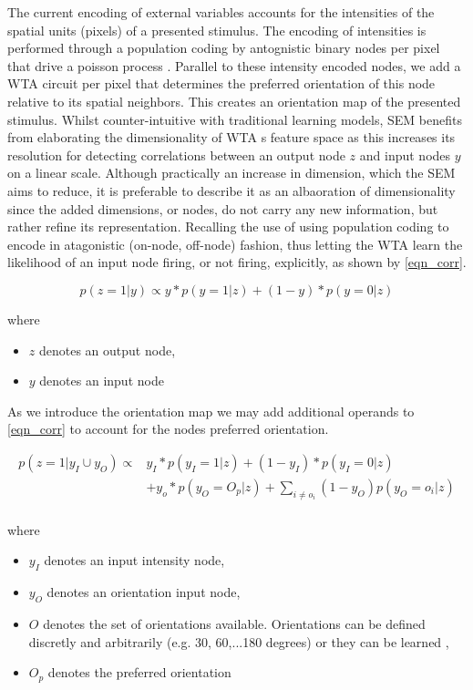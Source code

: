 \documentclass{report}
\begin{document}
The current encoding of external variables accounts for the intensities of the spatial units (pixels) of a presented stimulus. The encoding of intensities is performed through a population coding by antognistic binary nodes per pixel that drive a poisson process \cite{Nessler2010}. Parallel to these intensity encoded nodes, we add a WTA circuit per pixel that determines the preferred orientation of this node relative to its spatial neighbors. This creates an orientation map of the presented stimulus. Whilst counter-intuitive with traditional learning models, SEM benefits from elaborating the dimensionality of WTA
s feature space as this increases its resolution for detecting correlations between an output node $z$ and input nodes $y$ on a linear scale. Although practically an increase in dimension, which the SEM aims to reduce, it is preferable to describe it as an albaoration of dimensionality since the added dimensions, or nodes, do not carry any new information, but rather refine its representation. Recalling the use of using population coding to encode in atagonistic (on-node, off-node) fashion, thus letting the WTA learn the likelihood of an input node firing, or not firing, explicitly, as shown by \ref{eqn_corr}.

\begin{equation}
	p(z=1|y) \propto y*p(y=1|z) + (1-y)*p(y=0|z)
	\label{eqn_corr}
\end{equation}

where
\begin{itemize}
  \item $z$ denotes an output node,
  \item $y$ denotes an input node
\end{itemize}

As we introduce the orientation map we may add additional operands to \ref{eqn_corr} to account for the nodes preferred orientation.

\begin{equation}
	\begin{split}
		p(z=1|y_I \cup y_O) \propto &y_I*p(y_I=1|z) + (1-y_I)*p(y_I=0|z) \\
			&+ y_o*p(y_O=O_p|z)+\sum_{i\neq o_i} (1-y_O)p(y_O=o_i|z)\\
	\end{split}
	\label{eqn_corr2}
\end{equation}

where
\begin{itemize}
  \item $y_I$ denotes an input intensity node,
  \item $y_O$ denotes an orientation input node,
  \item $O$ denotes the set of orientations available. Orientations can be defined discretly and arbitrarily (e.g. 30, 60,...180 degrees) or they can be learned \cite{Nessler2010},
  \item $O_p$ denotes the preferred orientation
\end{itemize}
\end{document}
